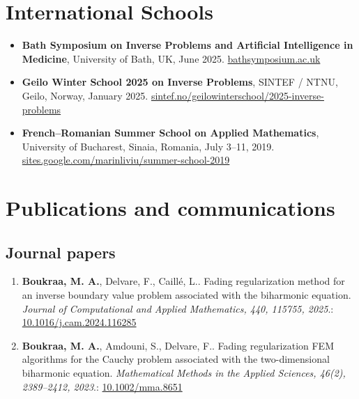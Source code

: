 \documentclass[10pt]{article} %
\begin{document}
\section*{International Schools}

\begin{itemize}

  \item \textbf{Bath Symposium on Inverse Problems and Artificial Intelligence in Medicine},  
  University of Bath, UK, June 2025.  
  \href{https://bathsymposium.ac.uk/symposium/inverse-problems-and-artificial-intelligence-in-medicine/}{bathsymposium.ac.uk}

  \item \textbf{Geilo Winter School 2025 on Inverse Problems},  
  SINTEF / NTNU, Geilo, Norway, January 2025.  
  \href{https://www.sintef.no/projectweb/geilowinterschool/2025-inverse-problems/}{sintef.no/geilowinterschool/2025-inverse-problems}


  \item \textbf{French–Romanian Summer School on Applied Mathematics},  
  University of Bucharest, Sinaia, Romania, July 3–11, 2019.  
  \href{https://sites.google.com/site/marinliviu/french-romanian-summer-school-on-applied-mathematics/6th-french-romanian-summer-school-on-applied-mathematics-3-11-july-2019}{sites.google.com/marinliviu/summer-school-2019}
\end{itemize}

\section{Publications and communications}
\subsection{Journal papers}
\begin{enumerate}
\item \textbf{Boukraa, M. A.}, Delvare, F., Caill{\'e}, L.. Fading regularization method for an inverse boundary value problem associated with the biharmonic equation. \textit{Journal of Computational and Applied Mathematics, 440, 115755, 2025}.: \href{https://doi.org/10.1016/j.cam.2024.116285}{10.1016/j.cam.2024.116285}
\item \textbf{Boukraa, M. A.}, Amdouni, S., Delvare, F.. Fading regularization FEM algorithms for the Cauchy problem associated with the two-dimensional biharmonic equation. \textit{Mathematical Methods in the Applied Sciences, 46(2), 2389--2412, 2023}.: \href{https://doi.org/10.1002/mma.8651}{10.1002/mma.8651}
\end{enumerate}
\end{document}

